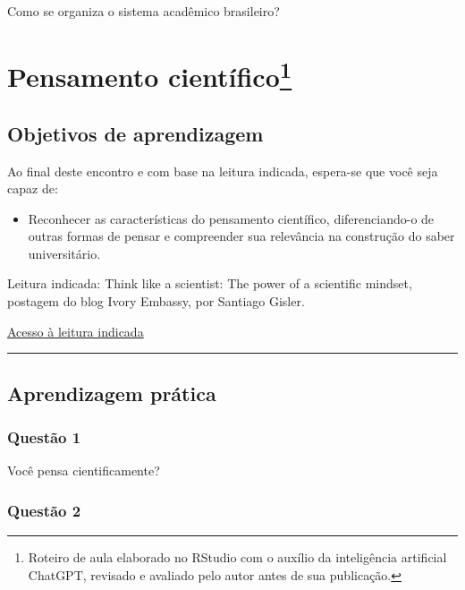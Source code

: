 \documentclass[
]{book}
\providecommand{\tightlist}{%
  \setlength{\itemsep}{0pt}\setlength{\parskip}{0pt}}
\begin{document}
Como se organiza o sistema acadêmico brasileiro?

\chapter[Pensamento científico]{\texorpdfstring{Pensamento científico\footnote{Roteiro de aula elaborado no RStudio com o auxílio da inteligência artificial ChatGPT, revisado e avaliado pelo autor antes de sua publicação.}}{Pensamento científico}}\label{pensamento-cientuxedfico1}

\section{Objetivos de aprendizagem}\label{objetivos-de-aprendizagem}

Ao final deste encontro e com base na leitura indicada, espera-se que você seja capaz de:

\begin{itemize}
\tightlist
\item
  Reconhecer as características do pensamento científico, diferenciando-o de outras formas de pensar e compreender sua relevância na construção do saber universitário.
\end{itemize}

Leitura indicada:
Think like a scientist: The power of a scientific mindset, postagem do blog Ivory Embassy, por Santiago Gisler.

\href{https://ivoryembassy.com/scientific-mindset/}{Acesso à leitura indicada}

\begin{center}\rule{0.5\linewidth}{0.5pt}\end{center}

\section{Aprendizagem prática}\label{aprendizagem-pruxe1tica-1}

\subsection{Questão 1}\label{questuxe3o-1-1}

Você pensa cientificamente?

\subsection{Questão 2}\label{questuxe3o-2}
\end{document}
